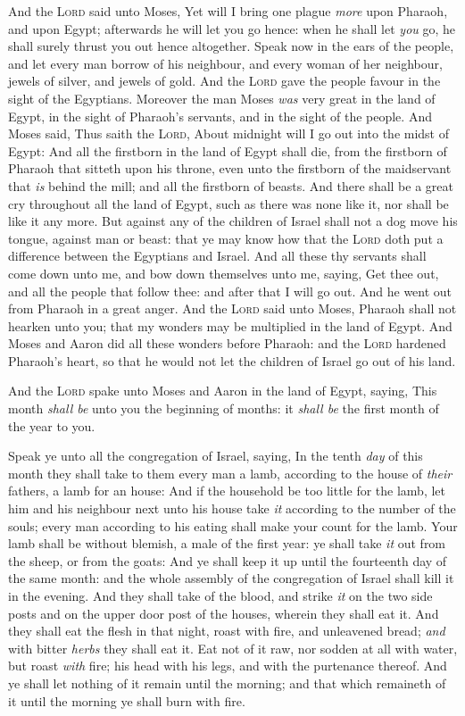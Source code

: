 \documentclass[11pt,letterpaper,oneside]{memoir}
\begin{document}
And the \textsc{Lord} said unto Moses, Yet will I bring one plague
\emph{more} upon Pharaoh, and upon Egypt; afterwards he will let you go
hence: when he shall let \emph{you} go, he shall surely thrust you out
hence altogether. Speak now in the ears of the people, and let every man
borrow of his neighbour, and every woman of her neighbour, jewels of
silver, and jewels of gold. And the \textsc{Lord} gave the people favour
in the sight of the Egyptians. Moreover the man Moses \emph{was} very
great in the land of Egypt, in the sight of Pharaoh's servants, and in
the sight of the people. And Moses said, Thus saith the \textsc{Lord},
About midnight will I go out into the midst of Egypt: And all the
firstborn in the land of Egypt shall die, from the firstborn of Pharaoh
that sitteth upon his throne, even unto the firstborn of the maidservant
that \emph{is} behind the mill; and all the firstborn of beasts. And
there shall be a great cry throughout all the land of Egypt, such as
there was none like it, nor shall be like it any more. But against any
of the children of Israel shall not a dog move his tongue, against man
or beast: that ye may know how that the \textsc{Lord} doth put a
difference between the Egyptians and Israel. And all these thy servants
shall come down unto me, and bow down themselves unto me, saying, Get
thee out, and all the people that follow thee: and after that I will go
out. And he went out from Pharaoh in a great anger. And the
\textsc{Lord} said unto Moses, Pharaoh shall not hearken unto you; that
my wonders may be multiplied in the land of Egypt. And Moses and Aaron
did all these wonders before Pharaoh: and the \textsc{Lord} hardened
Pharaoh's heart, so that he would not let the children of Israel go out
of his land.

And the \textsc{Lord} spake unto Moses and Aaron in the land of Egypt,
saying, This month \emph{shall be} unto you the beginning of months: it
\emph{shall be} the first month of the year to you.

Speak ye unto all the congregation of Israel, saying, In the tenth
\emph{day} of this month they shall take to them every man a lamb,
according to the house of \emph{their} fathers, a lamb for an house: And
if the household be too little for the lamb, let him and his neighbour
next unto his house take \emph{it} according to the number of the souls;
every man according to his eating shall make your count for the lamb.
Your lamb shall be without blemish, a male of the first year: ye shall
take \emph{it} out from the sheep, or from the goats: And ye shall keep
it up until the fourteenth day of the same month: and the whole assembly
of the congregation of Israel shall kill it in the evening. And they
shall take of the blood, and strike \emph{it} on the two side posts and
on the upper door post of the houses, wherein they shall eat it. And
they shall eat the flesh in that night, roast with fire, and unleavened
bread; \emph{and} with bitter \emph{herbs} they shall eat it. Eat not of
it raw, nor sodden at all with water, but roast \emph{with} fire; his
head with his legs, and with the purtenance thereof. And ye shall let
nothing of it remain until the morning; and that which remaineth of it
until the morning ye shall burn with fire.
\end{document}
